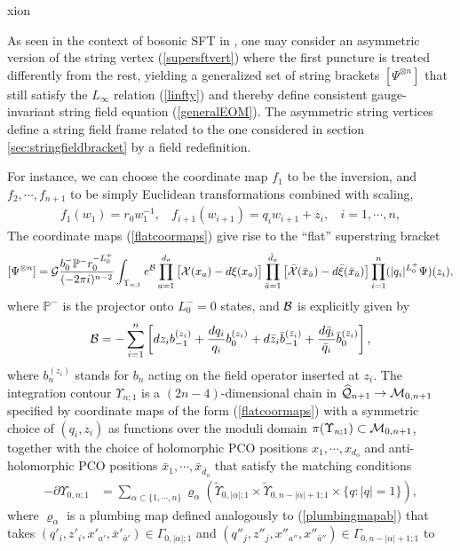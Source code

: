 xion\documentclass[12pt]{article}
\def\ie{\begin{equation}\begin{aligned}}
\def\fe{\end{aligned}\end{equation}}
\numberwithin{equation}{section}
\newcommand{\A}{{\alpha}}
\begin{document}
As seen in the context of bosonic SFT in \cite{Mazel:2024alu}, one may consider an asymmetric version of the string vertex (\ref{supersftvert}) where the first puncture is treated differently from the rest, yielding a generalized set of string brackets $[\Psi^{\otimes n}]$ that still satisfy the $L_\infty$ relation (\ref{linfty}) and thereby define consistent gauge-invariant string field equation (\ref{generalEOM}). The asymmetric string vertices define a string field frame related to the one considered in section \ref{sec:stringfieldbracket} by a field redefinition.


For instance, we can choose the coordinate map $f_1$ to be the inversion, and $f_2, \cdots, f_{n+1}$ to be simply Euclidean transformations combined with scaling,
\ie\label{flatcoormaps}
f_1(w_1) = r_0 w_1^{-1},~~~~ f_{i+1}(w_{i+1}) = q_i w_{i+1} + z_i,~~~~ i = 1,\cdots, n,
\fe
The coordinate maps (\ref{flatcoormaps}) give rise to the ``flat'' superstring bracket
\ie
[\Psi^{\otimes n}] =  {\cal G} {b_0^- \mathbb{P}^- r_0^{-L_0^+}\over (-2\pi i)^{n-2}} \int_{\Upsilon_{n;1}} e^{\cal B}\prod_{a=1}^{d_o} \big[ {\cal X}(x_a) - d\xi(x_a) \big] \prod_{\bar a=1}^{\bar d_o} \big[ \bar{\cal X}(\bar x_{\bar a}) - d\bar\xi(\bar x_{\bar a})\big] \prod_{i=1}^{n} (|q_i|^{L_0^+}\Psi)(z_i) ,
\fe
where $\mathbb{P}^-$ is the projector onto $L_0^-=0$ states, and ${\cal B}$ is explicitly given by
\ie\label{binsertflat}
{\cal B} = - \sum_{i=1}^n \left[ dz_i b_{-1}^{(z_i)} + {dq_i\over q_i} b_0^{(z_i)} + d\bar z_i \bar b_{-1}^{(\bar z_i)} + {d\bar q_i\over \bar q_i} \bar b_0^{(\bar z_i)} \right],
\fe
where $b_n^{(z_i)}$ stands for $b_n$ acting on the field operator inserted at $z_i$.
The integration contour $\Upsilon_{n;1}$ is a $(2n-4)$-dimensional chain in $\widehat{\cal Q}_{n+1}\to {\cal M}_{0,n+1}$ specified by coordinate maps of the form (\ref{flatcoormaps}) with a symmetric choice of $(q_i, z_i)$ as functions over the moduli domain $\pi(\Upsilon_{n;1})\subset {\cal M}_{0,n+1}$, together with the choice of holomorphic PCO positions $x_1, \cdots, x_{d_o}$ and anti-holomorphic PCO positions $\bar x_1, \cdots, \bar x_{\bar d_o}$ that satisfy the matching conditions
\ie\label{geommassuperflat}
- \partial \Upsilon_{0,n;1} &= \sum_{\A \subset\{1,\cdots,n\}} \varrho_{\A} \left( \widetilde\Upsilon_{0,|\A|;1}\times \widetilde\Upsilon_{0,n-|\A|+1;1}\times \{q:|q|=1\} \right),
\fe
where $\varrho_{\A}$ is a plumbing map defined analogously to (\ref{plumbingmapab}) that takes $(q'_i, z'_i, x'_{a'}, \bar x'_{\bar a'})\in \Gamma_{0,|\A|;1}$ and $(q''_j, z''_j, x''_{a''}, x''_{\bar a''})\in \Gamma_{0,n-|\A|+1;1}$ to
\end{document}
